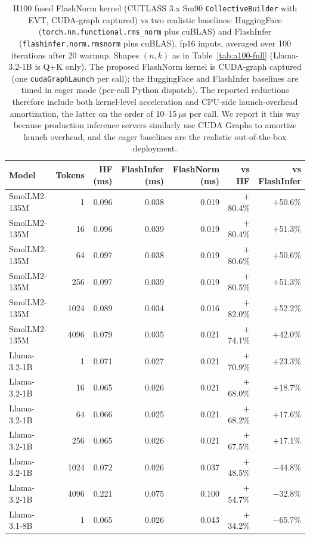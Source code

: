 \documentclass{article}
\begin{document}
\begin{table}[h!] \centering
\caption{H100 fused FlashNorm kernel (CUTLASS 3.x Sm90 \texttt{CollectiveBuilder} with EVT, CUDA-graph captured) vs two realistic baselines: HuggingFace (\texttt{torch.nn.functional.rms\_norm} plus cuBLAS) and FlashInfer (\texttt{flashinfer.norm.rmsnorm} plus cuBLAS). fp16 inputs, averaged over 100 iterations after 20 warmup. Shapes $(n, k)$ as in Table~\ref{tab:a100-full} (Llama-3.2-1B is Q+K only). The proposed FlashNorm kernel is CUDA-graph captured (one \texttt{cudaGraphLaunch} per call); the HuggingFace and FlashInfer baselines are timed in eager mode (per-call Python dispatch). The reported reductions therefore include both kernel-level acceleration and CPU-side launch-overhead amortization, the latter on the order of 10--15\,$\mu$s per call. We report it this way because production inference servers similarly use CUDA Graphs to amortize launch overhead, and the eager baselines are the realistic out-of-the-box deployment.}
\label{tab:h100-full}
\small
\begin{tabular}{l r r r r r r}
\hline
Model & Tokens & HF (ms) & FlashInfer (ms) & FlashNorm (ms) & vs HF & vs FlashInfer \\
\hline
SmolLM2-135M & 1    & 0.096 & 0.038 & 0.019 & $+$80.4\% & $+$50.6\% \\
SmolLM2-135M & 16   & 0.096 & 0.039 & 0.019 & $+$80.4\% & $+$51.3\% \\
SmolLM2-135M & 64   & 0.097 & 0.038 & 0.019 & $+$80.6\% & $+$50.6\% \\
SmolLM2-135M & 256  & 0.097 & 0.039 & 0.019 & $+$80.5\% & $+$51.3\% \\
SmolLM2-135M & 1024 & 0.089 & 0.034 & 0.016 & $+$82.0\% & $+$52.2\% \\
SmolLM2-135M & 4096 & 0.079 & 0.035 & 0.021 & $+$74.1\% & $+$42.0\% \\
\hline
Llama-3.2-1B & 1    & 0.071 & 0.027 & 0.021 & $+$70.9\% & $+$23.3\% \\
Llama-3.2-1B & 16   & 0.065 & 0.026 & 0.021 & $+$68.0\% & $+$18.7\% \\
Llama-3.2-1B & 64   & 0.066 & 0.025 & 0.021 & $+$68.2\% & $+$17.6\% \\
Llama-3.2-1B & 256  & 0.065 & 0.026 & 0.021 & $+$67.5\% & $+$17.1\% \\
Llama-3.2-1B & 1024 & 0.072 & 0.026 & 0.037 & $+$48.5\% & $-$44.8\% \\
Llama-3.2-1B & 4096 & 0.221 & 0.075 & 0.100 & $+$54.7\% & $-$32.8\% \\
\hline
Llama-3.1-8B & 1    & 0.065 & 0.026 & 0.043 & $+$34.2\% & $-$65.7\% \\

\end{tabular}
\end{table}
\end{document}
